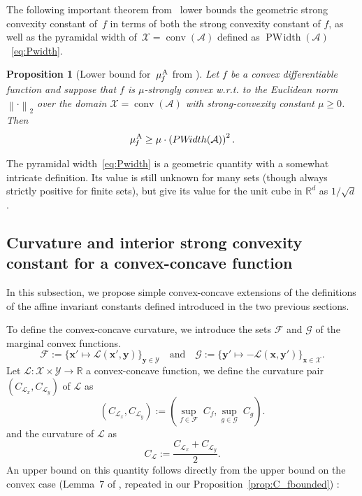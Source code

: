 \documentclass[twoside]{article}
\newcommand{\R}{\mathbb{R}}
\renewcommand{\L}{\mathcal{L}}
\newcommand{\X}{\mathcal{X}}
\newcommand{\Y}{\mathcal{Y}}
\newcommand{\M}{\X \times \Y}
\newcommand{\x}{\bm{x}}
\newcommand{\y}{\bm{y}}
\newtheorem{proposition}[definition]{Proposition}
\DeclareMathOperator*{\conv}{conv}
\providecommand{\normEucl}[1]{\left\lVert#1\right\rVert_2}
\newcommand{\domain}{\mathcal{\X}} %
\newcommand{\away}{{\hspace{0.05em}\textnormal{A}}}
\newcommand{\strongConvAFW}{\mu_{\hspace{-0.08em}f}^\away}
\newcommand{\A}{\mathcal{A}}
\newcommand{\PWidth}{\mathop{PW\!idth}}
\newcommand{\0}{\mathbf{0}} %
\begin{document}
  The following important theorem from~\citep{lacoste2015global} lower bounds the geometric strong convexity constant of~$f$ in terms of both the strong convexity constant of $f$, as well as the pyramidal width of~$\X = \conv{(\A)}$ defined as $\PWidth(\A)$~\eqref{eq:Pwidth}.

  \begin{proposition}[Lower bound for~$\strongConvAFW$ from {\citet[Theorem 6]{lacoste2015global}}]
  \label{thm:muFdirWinterpretation2}
  Let $f$ be a convex differentiable function and suppose that $f$ is
  $\mu$-\emph{strongly convex} w.r.t. to the Euclidean norm
  $\normEucl{\cdot}$ over the domain $\domain=\conv(\A)$ with strong-convexity constant $\mu
  \geq 0$. Then
  \begin{equation} \label{eq:muDirWidthBound}
  \strongConvAFW \geq \mu \cdot \left( \PWidth(\A) \right)^2.
  \end{equation}
  \end{proposition}
  
  The pyramidal width~\eqref{eq:Pwidth} is a geometric quantity with a somewhat intricate definition. Its value is still unknown for many sets (though always strictly positive for finite sets), but \citet[Lemma~4]{lacoste2015global} give its value for the unit cube in $\R^d$ as $1/{\sqrt{d}}$. 
  


\subsection{Curvature and interior strong convexity constant for a convex-concave function} %
\label{sub:curvature_and_interior_strong_convexity_constant_for_a_convex_concave_function}

  In this subsection, we propose simple convex-concave extensions of the definitions of the affine invariant constants defined introduced in the two previous sections.
    
  To define the convex-concave curvature, we introduce the sets $\mathcal{F}$ and $\mathcal G$ of the marginal convex functions. 
    \begin{equation}\label{eq:F_x}
       \mathcal{F} := \{\x' \mapsto \L(\x',\y)  \}_{\y \in \Y} 
       \quad \text{and} \quad
        \mathcal{G} := \{\y' \mapsto -\L(\x, \y') \}_{\x \in \X} .
    \end{equation}
  Let $\L : \M \to \R$ a convex-concave function, we define the curvature pair $(C_{\L_x},C_{\L_y})$ of $\L$ as 
    \begin{equation} \label{eq:CLx}
    (C_{\L_x},C_{\L_y}) := \left(\underset{f \in \mathcal{F}}
        {\sup}\; C_{f},\underset{g \in \mathcal{G} }
        {\sup}\; C_{g} \right).
      \end{equation}
 and the curvature of $\L$ as
  \begin{equation}\label{eq:CL}
  C_\L := \frac{C_{\L_x}+C_{\L_y}}{2}. 
  \end{equation}
 An upper bound on this quantity follows directly from the upper bound on the convex case (Lemma~7 of \citet{jaggi2013revisiting}, repeated in our Proposition~\ref{prop:C_fbounded}) :
\end{document}
